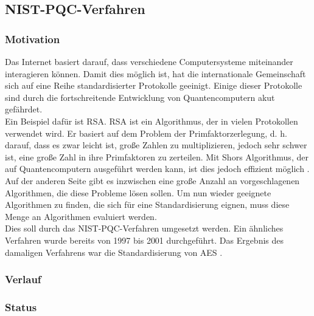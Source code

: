 		\subsection{NIST-PQC-Verfahren}
		\label{subsec:grundlagen:pqc:verfahren}
		
			\subsubsection{Motivation}
			\label{subsubsec:grundlagen:pqc:verfahren:motivation}
			
			Das Internet basiert darauf, dass verschiedene Computersysteme miteinander interagieren können.
			Damit dies möglich ist, hat die internationale Gemeinschaft sich auf eine Reihe standardisierter Protokolle geeinigt.
			Einige dieser Protokolle sind durch die fortschreitende Entwicklung von Quantencomputern akut gefährdet.\\

			Ein Beispiel dafür ist RSA. RSA ist ein Algorithmus, der in vielen Protokollen verwendet wird.
			Er basiert auf dem Problem der Primfaktorzerlegung, d. h. darauf, dass es zwar leicht ist, große Zahlen zu multiplizieren, jedoch sehr schwer ist, eine große Zahl in ihre Primfaktoren zu zerteilen.
			Mit Shors Algorithmus, der auf Quantencomputern ausgeführt werden kann, ist dies jedoch effizient möglich \cite{Nist2016}.\\

			Auf der anderen Seite gibt es inzwischen eine große Anzahl an vorgeschlagenen Algorithmen, die diese Probleme lösen sollen.
			Um nun wieder geeignete Algorithmen zu finden, die sich für eine Standardisierung eignen, muss diese Menge an Algorithmen evaluiert werden.\\

			Dies soll durch das NIST-PQC-Verfahren umgesetzt werden.
			Ein ähnliches Verfahren wurde bereits von 1997 bis 2001 durchgeführt.
			Das Ergebnis des damaligen Verfahrens war die Standardisierung von AES \cite{Schneier2000}.\\
				
			\subsubsection{Verlauf}
			\label{subsubsec:grundlagen:pqc:verfahren:verlauf}
			
			\subsubsection{Status}
			\label{subsubsec:grundlagen:pqc:verfahren:status}
	
